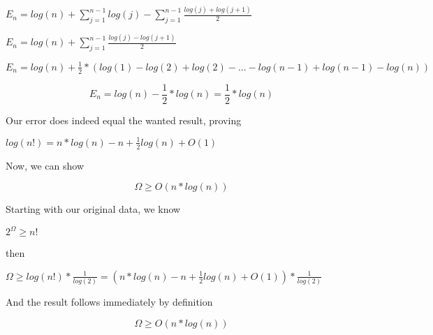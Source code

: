 \documentclass{article}
\begin{document}
\vspace{0.5cm}

$E_n = log(n) + \sum_{j=1}^{n-1} log(j) -  \sum_{j=1}^{n-1} \frac{log(j)+log(j+1)}{2}$

\vspace{0.5cm}

$E_n = log(n) + \sum_{j=1}^{n-1} \frac{log(j)-log(j+1)}{2}$

\vspace{0.5cm}

$E_n = log(n) + \frac{1}{2}*(log(1)-log(2)+log(2)-...-log(n-1)+log(n-1)-log(n))$

\vspace{0.5cm}

$$E_n = log(n) -\frac{1}{2}* log(n) = \frac{1}{2}*log(n)$$

Our error does indeed equal the wanted result, proving 

$log(n!) = n*log(n) - n + \frac{1}{2} log(n) + O(1)  $

Now, we can show 

$$\Omega \ge O(n* log(n))$$

Starting with our original data, we know 

$2^\Omega \ge n!$

then

$\Omega \ge log(n!)*\frac{1}{log(2)} = (n*log(n) - n + \frac{1}{2} log(n) + O(1))*\frac{1}{log(2)}$

And the result follows immediately by definition

$$\Omega \ge O(n*log(n))$$
\end{document}
